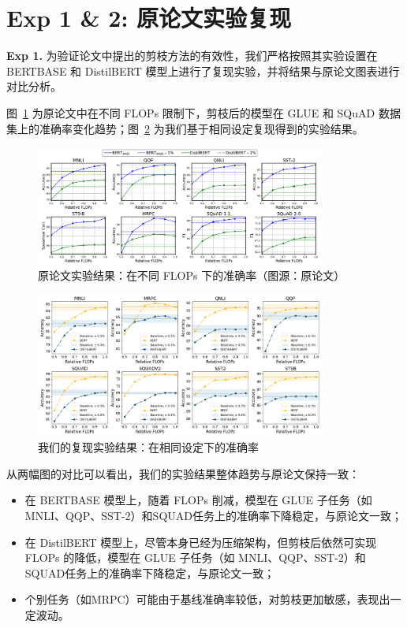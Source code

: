 \documentclass[UTF8,openany]{ctexbook}
\begin{document}
\section{Exp 1 \& 2: 原论文实验复现}

\noindent\textbf{Exp 1.} 为验证论文中提出的剪枝方法的有效性，我们严格按照其实验设置在 BERTBASE 和 DistilBERT 模型上进行了复现实验，并将结果与原论文图表进行对比分析。

图~\ref{fig:original_results} 为原论文中在不同 FLOPs 限制下，剪枝后的模型在 GLUE 和 SQuAD 数据集上的准确率变化趋势；图~\ref{fig:reproduced_results} 为我们基于相同设定复现得到的实验结果。

\begin{figure}[H]
    \centering
    \includegraphics[width=0.85\textwidth]{img/yunlunwenzhu.png}
    \caption{原论文实验结果：在不同 FLOPs 下的准确率（图源：原论文）}
    \label{fig:original_results}
\end{figure}

\begin{figure}[H]
    \centering
    \includegraphics[width=0.85\textwidth]{img/ourzhu.png}
    \caption{我们的复现实验结果：在相同设定下的准确率}
    \label{fig:reproduced_results}
\end{figure}

从两幅图的对比可以看出，我们的实验结果整体趋势与原论文保持一致：

\begin{itemize}[itemsep=0pt, topsep=0pt, parsep=0pt, partopsep=0pt]
    \item 在 BERTBASE 模型上，随着 FLOPs 削减，模型在 GLUE 子任务（如 MNLI、QQP、SST-2）和SQUAD任务上的准确率下降稳定，与原论文一致；
    \item 在 DistilBERT 模型上，尽管本身已经为压缩架构，但剪枝后依然可实现  FLOPs 的降低，模型在 GLUE 子任务（如 MNLI、QQP、SST-2）和SQUAD任务上的准确率下降稳定，与原论文一致；
    \item 个别任务（如MRPC）可能由于基线准确率较低，对剪枝更加敏感，表现出一定波动。
\end{itemize}
\end{document}
